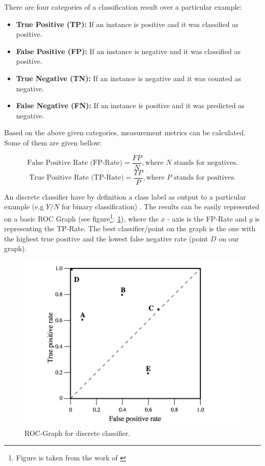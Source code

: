 There are four categories of a classification result over a particular example:

\begin{itemize}
    \item \textbf{True Positive (TP): }  If an instance is positive and it was classified as positive.
      \item \textbf{False Positive (FP): }  If an instance is negative and it was classified as positive.
    \item \textbf{True Negative (TN):}  If an instance is negative and it was counted as negative.
    \item \textbf{False Negative (FN):}  If an instance is positive and it was predicted as negative.
\end{itemize}

Based on the above given categories, measurement metrics can be calculated. Some of them are given bellow:

\[ \textrm{False Positive Rate (FP-Rate)} = \frac{FP}{N}, \textrm{where } N \textrm{ stands for negatives.}  \]
\[ \textrm{True Positive Rate (TP-Rate)} = \frac{TP}{P}, \textrm{where } P \textrm{ stands for positives.}  \]


An discrete classifier have by definition a class label as output to a particular example (e.g \(Y\)/\(N\) for binary classification) \cite{Fawcett:2006:IRA:1159473.1159475}. The results can be easily represented on a basic ROC Graph (see figure\footnote{Figure is taken from the work of \cite{Fawcett:2006:IRA:1159473.1159475}}: \ref{fig:roc-graph}), where the \(x\) - axis is the FP-Rate and \(y\) is representing the TP-Rate. The best classifier/point on the graph is the one with the highest true positive and the lowest false negative rate (point \(D\) on our graph).
\begin{figure}[h!]
    \centering
    \includegraphics[scale=0.6]{Graphics/roc-graph.png}
    \caption{ROC-Graph for discrete classifier.}
    \label{fig:roc-graph}
\end{figure}

